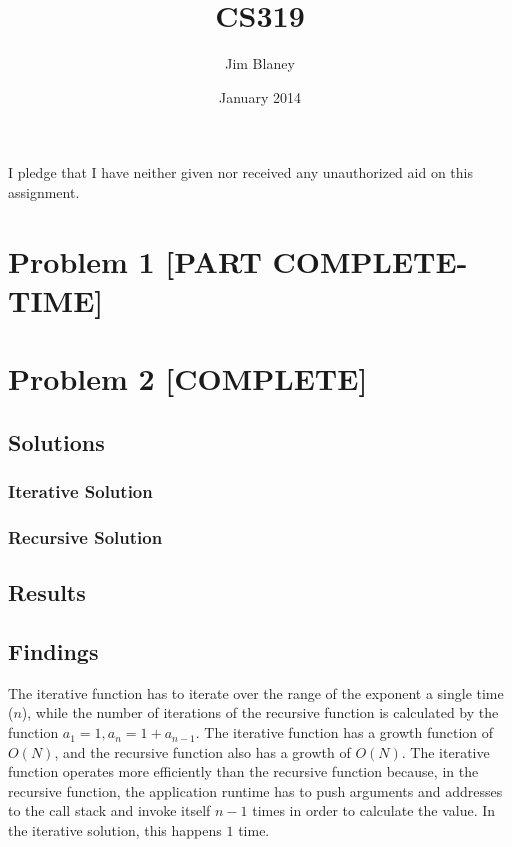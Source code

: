 \documentclass{article}
\title{CS319}
\author{Jim Blaney}
\date{January 2014}
\begin{document}
\noindent I pledge that I have neither given nor received any unauthorized aid on this assignment. \\[4em]

\section*{Problem 1 [PART COMPLETE-TIME]}



\section*{Problem 2 [COMPLETE]}

\subsection*{Solutions}
  \begin{multicols}{2}
    \subsubsection*{Iterative Solution}
      
    \subsubsection*{Recursive Solution}
      
  \end{multicols}

\subsection*{Results}

\begin{minipage}{.57\linewidth}
  
\end{minipage}
\begin{minipage}{.43\linewidth}
  
\end{minipage}

\subsection*{Findings}

The iterative function has to iterate over the range of the exponent a single time ($n$), while the number of iterations of the recursive function is calculated by the function $a_1 = 1, a_n = 1 + a_{n - 1}$. The iterative function has a growth function of $O(N)$, and the recursive function also has a growth of $O(N)$. The iterative function operates more efficiently than the recursive function because, in the recursive function, the application runtime has to push arguments and addresses to the call stack and invoke itself $n - 1$ times in order to calculate the value. In the iterative solution, this happens $1$ time.
\end{document}
